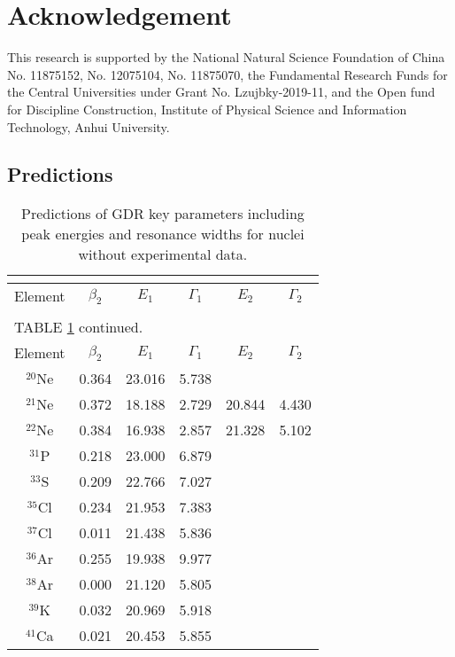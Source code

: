 \documentclass[twocolumn,showpacs,superscriptaddress,amsmath,amssymb,prc,preprintnumbers]{revtex4-1}
\begin{document}
\section*{Acknowledgement}
This research is supported by the National Natural Science Foundation of China No. 11875152, No. 12075104, No. 11875070, the Fundamental Research Funds for the Central Universities under Grant No. Lzujbky-2019-11, and the Open fund for Discipline Construction, Institute of Physical Science and Information Technology, Anhui University.


\begin{center}
\appendix
\section{Predictions}
\begin{longtable}{c@{\extracolsep{\fill}}ccccc}
\caption{Predictions of GDR key parameters including peak energies and resonance widths for nuclei without experimental data.} \label{tab:prediction}
\\
\multicolumn{6}{c}{} \\
\hline
Element & $\beta_2$ & $E_1$ & $\Gamma _1$ & $E_2$ & $\Gamma _2$  \\
\hline
\endfirsthead
\\
\multicolumn{6}{l}{TABLE \ref{tab:prediction} continued.} \\
\hline
Element & $\beta_2$ & $E_1$ & $\Gamma _1$ & $E_2$ & $\Gamma _2$  \\
\hline \endhead
\hline \endfoot
  \endlastfoot
        $^{20}$Ne & 0.364  & 23.016  & 5.738  &  &  \\
        $^{21}$Ne & 0.372  & 18.188  & 2.729  & 20.844  & 4.430  \\
        $^{22}$Ne & 0.384  & 16.938  & 2.857  & 21.328  & 5.102  \\
        $^{31}$P & 0.218  & 23.000  & 6.879  &  &  \\
        $^{33}$S & 0.209  & 22.766  & 7.027  &  &  \\
        $^{35}$Cl & 0.234  & 21.953  & 7.383  &  &  \\
        $^{37}$Cl & 0.011  & 21.438  & 5.836  &  &  \\
        $^{36}$Ar & 0.255  & 19.938  & 9.977  &  &  \\
        $^{38}$Ar & 0.000 & 21.120  &  5.805  &  &  \\
        $^{39}$K & 0.032  & 20.969  & 5.918  &  &  \\
        $^{41}$Ca & 0.021  & 20.453  & 5.855  &  &  \\

\end{longtable}
\end{center}
\end{document}
